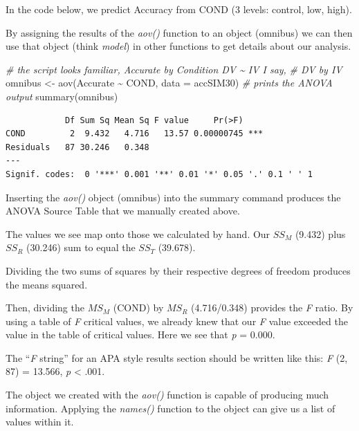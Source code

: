 \documentclass[
  11pt,
]{book}
\newenvironment{Shaded}{\begin{snugshade}}{\end{snugshade}}
\newcommand{\AttributeTok}[1]{\textcolor[rgb]{0.77,0.63,0.00}{#1}}
\newcommand{\CommentTok}[1]{\textcolor[rgb]{0.56,0.35,0.01}{\textit{#1}}}
\newcommand{\FunctionTok}[1]{\textcolor[rgb]{0.00,0.00,0.00}{#1}}
\newcommand{\NormalTok}[1]{#1}
\newcommand{\OtherTok}[1]{\textcolor[rgb]{0.56,0.35,0.01}{#1}}
\newcommand{\SpecialCharTok}[1]{\textcolor[rgb]{0.00,0.00,0.00}{#1}}
\begin{document}
In the code below, we predict Accuracy from COND (3 levels: control, low, high).

By assigning the results of the \emph{aov()} function to an object (omnibus) we can then use that object (think \emph{model}) in other functions to get details about our analysis.

\begin{Shaded}
\begin{Highlighting}[]
\CommentTok{\# the script looks familiar, \textquotesingle{}Accurate by Condition\textquotesingle{} DV \textasciitilde{} IV I say,}
\CommentTok{\# \textquotesingle{}DV by IV\textquotesingle{}}
\NormalTok{omnibus }\OtherTok{\textless{}{-}} \FunctionTok{aov}\NormalTok{(Accurate }\SpecialCharTok{\textasciitilde{}}\NormalTok{ COND, }\AttributeTok{data =}\NormalTok{ accSIM30)}
\CommentTok{\# prints the ANOVA output}
\FunctionTok{summary}\NormalTok{(omnibus)}
\end{Highlighting}
\end{Shaded}

\begin{verbatim}
            Df Sum Sq Mean Sq F value     Pr(>F)    
COND         2  9.432   4.716   13.57 0.00000745 ***
Residuals   87 30.246   0.348                       
---
Signif. codes:  0 '***' 0.001 '**' 0.01 '*' 0.05 '.' 0.1 ' ' 1
\end{verbatim}

Inserting the \emph{aov()} object (omnibus) into the summary command produces the ANOVA Source Table that we manually created above.

The values we see map onto those we calculated by hand. Our \(SS_M\) (9.432) plus \(SS_R\) (30.246) sum to equal the \(SS_T\) (39.678).

Dividing the two sums of squares by their respective degrees of freedom produces the means squared.

Then, dividing the \(MS_M\) (COND) by \(MS_R\) (4.716/0.348) provides the \emph{F} ratio. By using a table of \emph{F} critical values, we already knew that our \emph{F} value exceeded the value in the table of critical values. Here we see that \emph{p} = 0.000.

The ``\emph{F} string'' for an APA style results section should be written like this: \emph{F} (2, 87) = 13.566, \emph{p} \textless{} .001.

The object we created with the \emph{aov()} function is capable of producing much information. Applying the \emph{names()} function to the object can give us a list of values within it.
\end{document}
